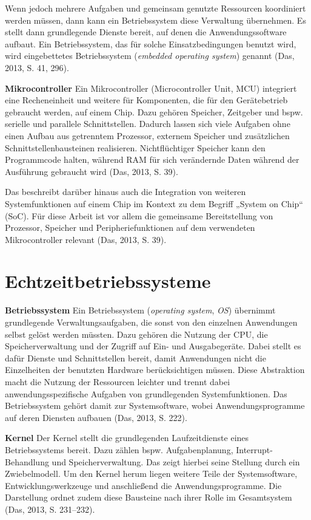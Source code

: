Wenn jedoch mehrere Aufgaben und gemeinsam genutzte Ressourcen koordiniert werden müssen, dann kann ein Betriebssystem diese Verwaltung übernehmen. Es stellt dann grundlegende Dienste bereit, auf denen die Anwendungssoftware aufbaut. Ein Betriebssystem, das für solche Einsatzbedingungen benutzt wird, wird eingebettetes Betriebssystem (\emph{embedded operating system}) genannt (Das, 2013, S. 41, 296).

\textbf{Mikrocontroller }Ein Mikrocontroller (Microcontroller Unit, MCU) integriert eine Recheneinheit und weitere für Komponenten, die für den Gerätebetrieb gebraucht werden, auf einem Chip. Dazu gehören Speicher, Zeitgeber und bspw. serielle und parallele Schnittstellen. Dadurch lassen sich viele Aufgaben ohne einen Aufbau aus getrenntem Prozessor, externem Speicher und zusätzlichen Schnittstellenbausteinen realisieren. Nichtflüchtiger Speicher kann den Programmcode halten, während RAM für sich verändernde Daten während der Ausführung gebraucht wird (Das, 2013, S. 39).

Das beschreibt darüber hinaus auch die Integration von weiteren Systemfunktionen auf einem Chip im Kontext zu dem Begriff „System on Chip“ (SoC). Für diese Arbeit ist vor allem die gemeinsame Bereitstellung von Prozessor, Speicher und Peripheriefunktionen auf dem verwendeten Mikrocontroller relevant (Das, 2013, S. 39).

\section{Echtzeitbetriebssysteme}
\textbf{Betriebssystem }Ein Betriebssystem (\emph{operating system}, \emph{OS}) übernimmt grundlegende Verwaltungsaufgaben, die sonst von den einzelnen Anwendungen selbst gelöst werden müssten. Dazu gehören die Nutzung der CPU, die Speicherverwaltung und der Zugriff auf Ein- und Ausgabegeräte. Dabei stellt es dafür Dienste und Schnittstellen bereit, damit Anwendungen nicht die Einzelheiten der benutzten Hardware berücksichtigen müssen. Diese Abstraktion macht die Nutzung der Ressourcen leichter und trennt dabei anwendungsspezifische Aufgaben von grundlegenden Systemfunktionen. Das Betriebssystem gehört damit zur Systemsoftware, wobei Anwendungsprogramme auf deren Diensten aufbauen (Das, 2013, S. 222).

\textbf{Kernel} Der Kernel stellt die grundlegenden Laufzeitdienste eines Betriebssystems bereit. Dazu zählen bspw. Aufgabenplanung, Interrupt-Behandlung und Speicherverwaltung. Das zeigt hierbei seine Stellung durch ein Zwiebelmodell. Um den Kernel herum liegen weitere Teile der Systemsoftware, Entwicklungswerkzeuge und anschließend die Anwendungsprogramme. Die Darstellung ordnet zudem diese Bausteine nach ihrer Rolle im Gesamtsystem (Das, 2013, S. 231–232).

